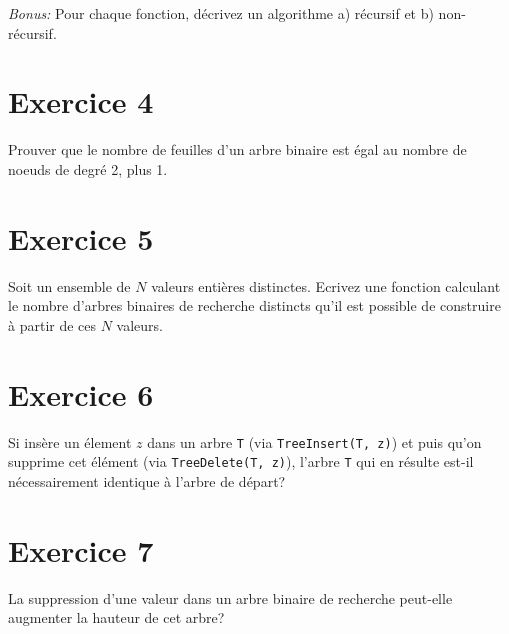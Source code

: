 \documentclass[a4paper,10pt]{article}
\begin{document}
\textit{Bonus:} Pour chaque fonction, décrivez un algorithme a) récursif et b) non-récursif.

\section*{Exercice 4}

Prouver que le nombre de feuilles d'un arbre binaire est égal au nombre de noeuds de degré 2, plus 1.

\section*{Exercice 5}

Soit un ensemble de $N$ valeurs entières distinctes. Ecrivez une fonction calculant le nombre d'arbres binaires de recherche distincts qu'il est possible de construire à partir de ces $N$ valeurs.

\section*{Exercice 6}

Si insère un élement $z$ dans un arbre \texttt{T} (via \texttt{TreeInsert(T, z)}) et puis qu'on supprime cet élément (via \texttt{TreeDelete(T, z)}), l'arbre \texttt{T} qui en résulte est-il nécessairement identique à l'arbre de départ?

\section*{Exercice 7}

La suppression d'une valeur dans un arbre binaire de recherche peut-elle augmenter la hauteur de cet arbre?






\end{document}
